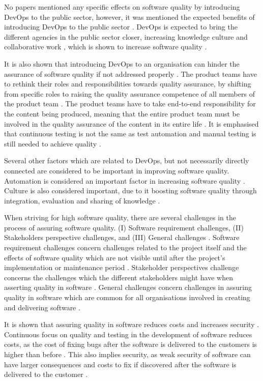 No papers mentioned any specific effects on software quality by introducing DevOps to the public sector, however, it was mentioned the expected benefits of introducing DevOps to the public sector \cite{mm_2021}. DevOps is expected to bring the different agencies in the public sector closer, increasing knowledge culture and collaborative work \cite{mm_2021}, which is shown to increase software quality \cite{smm_2018}.

It is also shown that introducing DevOps to an organisation can hinder the assurance of software quality if not addressed properly \cite{dsc_2019}. The product teams have to rethink their roles and responsibilities towards quality assurance, by shifting from specific roles to raising the quality assurance competence of all members of the product team \cite{dsc_2019}. The product teams have to take end-to-end responsibility for the content being produced, meaning that the entire product team must be involved in the quality assurance of the content in its entire life \cite{dsc_2019}. It is emphasised that continuous testing is not the same as test automation and manual testing is still needed to achieve quality \cite{dsc_2019}.

Several other factors which are related to DevOps, but not necessarily directly connected are considered to be important in improving software quality. Automation is considered an important factor in increasing software quality \cite{smm_2018}. Culture is also considered important, due to it boosting software quality through integration, evaluation and sharing of knowledge \cite{smm_2018}.

When striving for high software quality, there are several challenges in the process of assuring software quality. (I) Software requirement challenges, (II) Stakeholders perspective challenges, and (III) General challenges \cite{sh_2018}. Software requirement challenges concern challenges related to the project itself and the effects of software quality which are not visible until after the project's implementation or maintenance period \cite{sh_2018}. Stakeholder perspectives challenge concerns the challenges which the different stakeholders might have when asserting quality in software \cite{sh_2018}. General challenges concern challenges in assuring quality in software which are common for all organisations involved in creating and delivering software \cite{sh_2018}.

It is shown that assuring quality in software reduces costs and increases security \cite{csw_2011}\cite{sh_2018}. Continuous focus on quality and testing in the development of software reduces costs, as the cost of fixing bugs after the software is delivered to the customers is higher than before \cite{sh_2018}\cite{csw_2011}. This also implies security, as weak security of software can have larger consequences and costs to fix if discovered after the software is delivered to the customer \cite{csw_2011}. 

